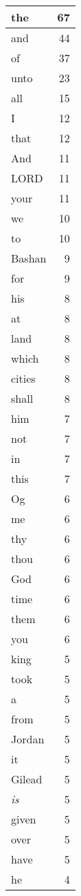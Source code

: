 \begin{center}
\begin{longtable}{l|r}
\hline \hline
\endlastfoot
the & 67 \\ \hline
and & 44 \\ \hline
of & 37 \\ \hline
unto & 23 \\ \hline
all & 15 \\ \hline
I & 12 \\ \hline
that & 12 \\ \hline
And & 11 \\ \hline
LORD & 11 \\ \hline
your & 11 \\ \hline
we & 10 \\ \hline
to & 10 \\ \hline
Bashan & 9 \\ \hline
for & 9 \\ \hline
his & 8 \\ \hline
at & 8 \\ \hline
land & 8 \\ \hline
which & 8 \\ \hline
cities & 8 \\ \hline
shall & 8 \\ \hline
him & 7 \\ \hline
not & 7 \\ \hline
in & 7 \\ \hline
this & 7 \\ \hline
Og & 6 \\ \hline
me & 6 \\ \hline
thy & 6 \\ \hline
thou & 6 \\ \hline
God & 6 \\ \hline
time & 6 \\ \hline
them & 6 \\ \hline
you & 6 \\ \hline
king & 5 \\ \hline
took & 5 \\ \hline
a & 5 \\ \hline
from & 5 \\ \hline
Jordan & 5 \\ \hline
it & 5 \\ \hline
Gilead & 5 \\ \hline
\emph{is} & 5 \\ \hline
given & 5 \\ \hline
over & 5 \\ \hline
have & 5 \\ \hline
he & 4 \\ \hline

\end{longtable}
\end{center}
